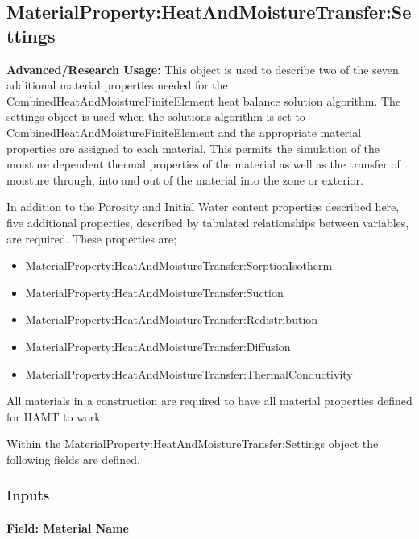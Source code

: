 \subsection{MaterialProperty:HeatAndMoistureTransfer:Settings}\label{materialpropertyheatandmoisturetransfersettings}

\textbf{Advanced/Research Usage:} This object is used to describe two of the seven additional material properties needed for the CombinedHeatAndMoistureFiniteElement heat balance solution algorithm. The settings object is used when the solutions algorithm is set to CombinedHeatAndMoistureFiniteElement and the appropriate material properties are assigned to each material. This permits the simulation of the moisture dependent thermal properties of the material as well as the transfer of moisture through, into and out of the material into the zone or exterior.

In addition to the Porosity and Initial Water content properties described here, five additional properties, described by tabulated relationships between variables, are required. These properties are;

\begin{itemize}
\item
  MaterialProperty:HeatAndMoistureTransfer:SorptionIsotherm
\item
  MaterialProperty:HeatAndMoistureTransfer:Suction
\item
  MaterialProperty:HeatAndMoistureTransfer:Redistribution
\item
  MaterialProperty:HeatAndMoistureTransfer:Diffusion
\item
  MaterialProperty:HeatAndMoistureTransfer:ThermalConductivity
\end{itemize}

All materials in a construction are required to have all material properties defined for HAMT to work.

Within the MaterialProperty:HeatAndMoistureTransfer:Settings object the following fields are defined.

\subsubsection{Inputs}\label{inputs-7-026}

\paragraph{Field: Material Name}\label{field-material-name-000}

